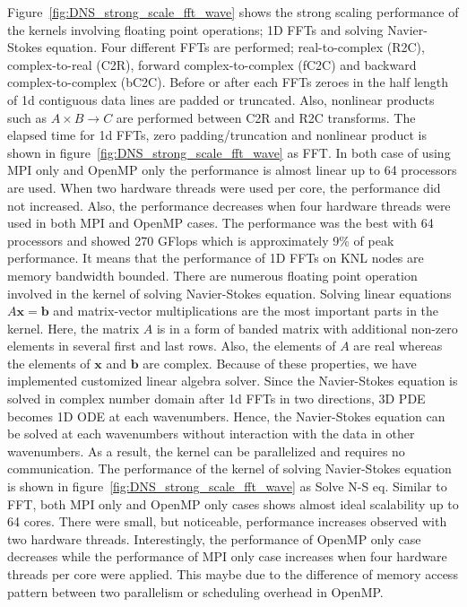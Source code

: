 Figure~\ref{fig:DNS_strong_scale_fft_wave} shows the strong scaling performance of the kernels involving floating point operations; 1D FFTs and solving Navier-Stokes equation. Four different FFTs are performed; real-to-complex (R2C), complex-to-real (C2R), forward complex-to-complex (fC2C) and backward complex-to-complex (bC2C). Before or after each FFTs zeroes in the half length of 1d contiguous data lines are padded or truncated. Also, nonlinear products such as $A\times B \rightarrow C$ are performed between C2R and R2C transforms. The elapsed time for 1d FFTs, zero padding/truncation and nonlinear product is shown in figure~\ref{fig:DNS_strong_scale_fft_wave} as FFT. In both case of using MPI only and OpenMP only the performance is almost linear up to 64 processors are used. When two hardware threads were used per core, the performance did not increased. Also, the performance decreases when four hardware threads were used in both MPI and OpenMP cases. The performance was the best with 64 processors and showed 270 GFlops which is approximately 9\% of peak performance. It means that the performance of 1D FFTs on KNL nodes are memory bandwidth bounded. There are numerous floating point operation involved in the kernel of solving Navier-Stokes equation. Solving linear equations $A \textbf{x} = \textbf{b}$ and matrix-vector multiplications are the most important parts in the kernel. Here, the matrix $A$ is in a form of banded matrix with additional non-zero elements in several first and last rows. Also, the elements of $A$ are real whereas the elements of $\textbf{x}$ and $\textbf{b}$ are complex. Because of these properties, we have implemented customized linear algebra solver. Since the Navier-Stokes equation is solved in complex number domain after 1d FFTs in two directions, 3D PDE becomes 1D ODE at each wavenumbers. Hence, the Navier-Stokes equation can be solved at each wavenumbers without interaction with the data in other wavenumbers. As a result, the kernel can be parallelized and requires no communication. The performance of the kernel of solving Navier-Stokes equation is shown in figure~\ref{fig:DNS_strong_scale_fft_wave} as Solve N-S eq. Similar to FFT, both MPI only and OpenMP only cases shows almost ideal scalability up to 64 cores. There were small, but noticeable, performance increases observed with two hardware threads. Interestingly, the performance of OpenMP only case decreases while the performance of MPI only case increases when four hardware threads per core were applied. This maybe due to the difference of memory access pattern between two parallelism or scheduling overhead in OpenMP.          

